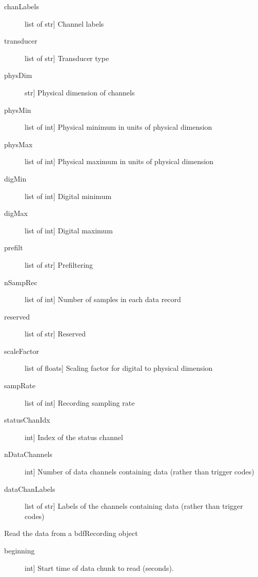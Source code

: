 \documentclass[letterpaper,10pt,english]{sphinxmanual}
\begin{document}
\begin{fulllineitems}
\begin{description}
\item[{chanLabels}] \leavevmode{[}list of str{]}
Channel labels

\item[{transducer}] \leavevmode{[}list of str{]}
Transducer type

\item[{physDim}] \leavevmode{[}str{]}
Physical dimension of channels

\item[{physMin}] \leavevmode{[}list of int{]}
Physical minimum in units of physical dimension

\item[{physMax}] \leavevmode{[}list of int{]}
Physical maximum in units of physical dimension

\item[{digMin}] \leavevmode{[}list of int{]}
Digital minimum

\item[{digMax}] \leavevmode{[}list of int{]}
Digital maximum

\item[{prefilt}] \leavevmode{[}list of str{]}
Prefiltering

\item[{nSampRec}] \leavevmode{[}list of int{]}
Number of samples in each data record

\item[{reserved}] \leavevmode{[}list of str{]}
Reserved

\item[{scaleFactor}] \leavevmode{[}list of floats{]}
Scaling factor for digital to physical dimension

\item[{sampRate}] \leavevmode{[}list of int{]}
Recording sampling rate

\item[{statusChanIdx}] \leavevmode{[}int{]}
Index of the status channel

\item[{nDataChannels}] \leavevmode{[}int{]}
Number of data channels containing data (rather than trigger codes)

\item[{dataChanLabels}] \leavevmode{[}list of str{]}
Labels of the channels containing data (rather than trigger codes)

\end{description}

\begin{fulllineitems}
\label{intro:pybdf.bdfRecording.get_data}
Read the data from a bdfRecording object
\begin{description}
\item[{beginning}] \leavevmode{[}int{]}
Start time of data chunk to read (seconds).


\end{description}
\end{fulllineitems}
\end{fulllineitems}
\end{document}
